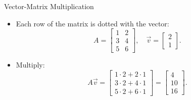 \documentclass{beamer}
\begin{document}
\begin{frame}{Vector-Matrix Multiplication}
  \begin{itemize}
    \item Each row of the matrix is dotted with the vector:
    \begin{equation}
    A = \begin{bmatrix} 1 & 2 \\ 3 & 4 \\ 5 & 6 \end{bmatrix}, \quad \vec{v} = \begin{bmatrix} 2 \\ 1 \end{bmatrix}.
    \end{equation}
    \item Multiply:
    \begin{equation}
    A\vec{v} = \begin{bmatrix}
    1\cdot2 + 2\cdot1 \\
    3\cdot2 + 4\cdot1 \\
    5\cdot2 + 6\cdot1
    \end{bmatrix} = \begin{bmatrix} 4 \\ 10 \\ 16 \end{bmatrix}.
    \end{equation}
  \end{itemize}
\end{frame}
\end{document}
